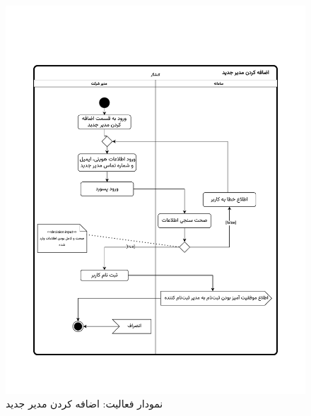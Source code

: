 \begin{figure}[ht!]
	\centering
	\includegraphics[scale=0.8, page=1]{figs/OOD-activity-addmanager.pdf}
	\caption{نمودار فعالیت: اضافه کردن مدیر جدید}
\end{figure}
\FloatBarrier
\newpage

